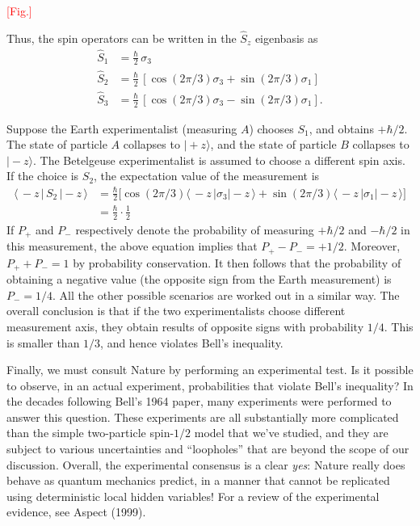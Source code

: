 \documentclass[pra,11pt]{revtex4}
\begin{document}
\textcolor{red}{[Fig.]}

Thus, the spin operators can be written in the $\hat{S}_z$ eigenbasis as
$$\begin{aligned}\hat{S}_1 &= \frac{\hbar}{2} \, \sigma_3 \\ \hat{S}_2 &= \frac{\hbar}{2} \, \left[\cos(2\pi/3) \sigma_3 + \sin(2\pi/3)\sigma_1\right]  \\   \hat{S}_3 &= \frac{\hbar}{2} \, \left[\cos(2\pi/3) \sigma_3 - \sin(2\pi/3)\sigma_1\right].\end{aligned}$$

Suppose the Earth experimentalist (measuring $A$) chooses $S_1$, and
obtains $+\hbar/2$.  The state of particle $A$ collapses to
$|\!+\!z\rangle$, and the state of particle $B$ collapses to
$|\!-\!z\rangle$.  The Betelgeuse experimentalist is assumed to
choose a different spin axis.  If the choice is $S_2$, the expectation
value of the measurement is
$$\begin{aligned}\langle\, - z \, | \, S_2 \,|-\!z\,\rangle &= \frac{\hbar}{2} \Big[\cos(2\pi/3) \langle\,- z\,|\sigma_3| - \!z\,\rangle + \sin(2\pi/3)\langle\,- z\,|\sigma_1|-\!z\,\rangle\Big]\\ &= \frac{\hbar}{2} \cdot \frac{1}{2} \end{aligned}$$
If $P_+$ and $P_-$ respectively denote the probability of measuring
$+\hbar/2$ and $-\hbar/2$ in this measurement, the above equation
implies that $P_+ - P_- = + 1/2$.  Moreover, $P_+ + P_- = 1$ by
probability conservation.  It then follows that the probability of
obtaining a negative value (the opposite sign from the Earth
measurement) is $P_- = 1/4$.  All the other possible scenarios are
worked out in a similar way.  The overall conclusion is that if the
two experimentalists choose different measurement axis, they obtain
results of opposite signs with probability $1/4$.  This is smaller
than $1/3$, and hence violates Bell's inequality.

Finally, we must consult Nature by performing an experimental test.
Is it possible to observe, in an actual experiment, probabilities that
violate Bell's inequality?  In the decades following Bell's 1964
paper, many experiments were performed to answer this question.  These
experiments are all substantially more complicated than the simple
two-particle spin-$1/2$ model that we've studied, and they are subject
to various uncertainties and ``loopholes'' that are beyond the scope
of our discussion.  Overall, the experimental consensus is a clear
\textit{yes}: Nature really does behave as quantum mechanics predict,
in a manner that cannot be replicated using deterministic local hidden
variables!  For a review of the experimental evidence, see Aspect
(1999).
\end{document}
